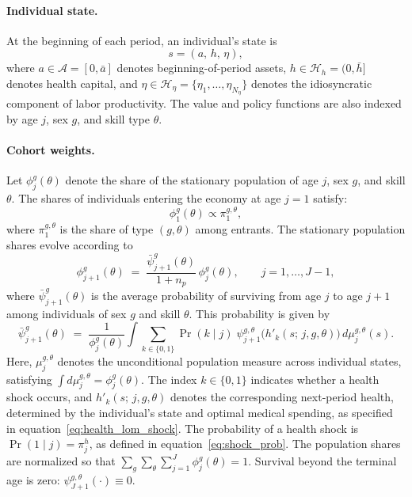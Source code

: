 \documentclass[12pt,a4paper]{article}
\begin{document}
\paragraph{Individual state.}
At the beginning of each period, an individual's state is
\begin{equation}
\label{eq:state}
s = (a,\, h,\, \eta),
\end{equation}
where $a \in \mathcal{A} = [0, \bar{a}]$ denotes beginning-of-period assets, $h \in \mathcal{H}_h = (0, \bar{h}]$ denotes health capital, and $\eta \in \mathcal{H}_\eta = \{\eta_1, \ldots, \eta_{N_\eta}\}$ denotes the idiosyncratic component of labor productivity. The value and policy functions are also indexed by age $j$, sex $g$, and skill type $\theta$.

\paragraph{Cohort weights.}
Let $\phi_j^{g}(\theta)$ denote the share of the stationary population of age $j$, sex $g$, and skill $\theta$. The shares of individuals entering the economy at age $j=1$ satisfy:
\[
\phi_1^g(\theta) \propto \pi_1^{g,\theta},
\]
where $\pi_1^{g,\theta}$ is the share of type $(g,\theta)$ among entrants. The stationary population shares evolve according to
\begin{equation}
\label{eq:cohort_weights}
\phi_{j+1}^{g}(\theta) \;=\; \frac{\bar{\psi}_{j+1}^{g}(\theta)}{1 + n_p}\, \phi_{j}^{g}(\theta), \qquad j = 1, \ldots, J-1,
\end{equation}
where $\bar{\psi}_{j+1}^{g}(\theta)$ is the average probability of surviving from age $j$ to age $j+1$ among individuals of sex $g$ and skill $\theta$. This probability is given by
\begin{equation}
\label{eq:avg_survival}
\bar{\psi}_{j+1}^{g}(\theta)
\;=\;
\frac{1}{\phi_{j}^{g}(\theta)} \int \sum_{k \in \{0,1\}} \Pr(k \mid j)\;
\psi_{j+1}^{g,\theta}\bigl(h'_k(s;\, j, g, \theta)\bigr)\, d\mu_j^{g,\theta}(s).
\end{equation}
Here, $\mu_j^{g,\theta}$ denotes the unconditional population measure across individual states, satisfying $\int d\mu_j^{g,\theta} = \phi_j^{g}(\theta)$. The index $k \in \{0,1\}$ indicates whether a health shock occurs, and $h'_k(s;\, j, g, \theta)$ denotes the corresponding next-period health, determined by the individual's state and optimal medical spending, as specified in equation~\eqref{eq:health_lom_shock}. The probability of a health shock is $\Pr(1 \mid j) = \pi^h_j$, as defined in equation~\eqref{eq:shock_prob}. The population shares are normalized so that $\sum_g \sum_\theta \sum_{j=1}^{J} \phi_j^{g}(\theta) = 1$. Survival beyond the terminal age is zero: $\psi_{J+1}^{g,\theta}(\cdot) \equiv 0$.
\end{document}
